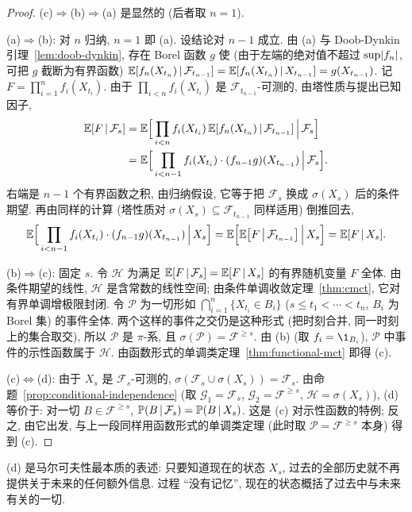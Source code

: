 \begin{proof}
(c)$\Rightarrow$(b)$\Rightarrow$(a) 是显然的 (后者取 $n=1$).

(a)$\Rightarrow$(b): 对 $n$ 归纳, $n=1$ 即 (a). 设结论对 $n-1$ 成立. 由 (a) 与 Doob-Dynkin 引理~\ref{lem:doob-dynkin}, 存在 Borel 函数 $g$ 使 (由于左端的绝对值不超过 $\sup\abs{f_n}$, 可把 $g$ 截断为有界函数) $\E[f_n(X_{t_n})\,|\,\mathcal{F}_{t_{n-1}}]=\E[f_n(X_{t_n})\,|\,X_{t_{n-1}}]=g(X_{t_{n-1}})$. 记 $F=\prod_{i=1}^nf_i(X_{t_i})$. 由于 $\prod_{i<n}f_i(X_{t_i})$ 是 $\mathcal{F}_{t_{n-1}}$-可测的, 由塔性质与提出已知因子,
\begin{align*}
\E[F\,|\,\mathcal{F}_s]&=\E\Big[\prod_{i<n}f_i(X_{t_i})\,\E[f_n(X_{t_n})\,|\,\mathcal{F}_{t_{n-1}}]\,\Big|\,\mathcal{F}_s\Big]\\
&=\E\Big[\prod_{i<n-1}f_i(X_{t_i})\cdot(f_{n-1}g)(X_{t_{n-1}})\,\Big|\,\mathcal{F}_s\Big].
\end{align*}
右端是 $n-1$ 个有界函数之积, 由归纳假设, 它等于把 $\mathcal{F}_s$ 换成 $\sigma(X_s)$ 后的条件期望. 再由同样的计算 (塔性质对 $\sigma(X_s)\subseteq\mathcal{F}_{t_{n-1}}$ 同样适用) 倒推回去,
\[
\E\Big[\prod_{i<n-1}f_i(X_{t_i})\cdot(f_{n-1}g)(X_{t_{n-1}})\,\Big|\,X_s\Big]=\E\Big[\E\big[F\,\big|\,\mathcal{F}_{t_{n-1}}\big]\,\Big|\,X_s\Big]=\E[F\,|\,X_s].
\]

(b)$\Rightarrow$(c): 固定 $s$. 令 $\mathcal{H}$ 为满足 $\E[F\,|\,\mathcal{F}_s]=\E[F\,|\,X_s]$ 的有界随机变量 $F$ 全体. 由条件期望的线性, $\mathcal{H}$ 是含常数的线性空间; 由条件单调收敛定理~\ref{thm:cmct}, 它对有界单调增极限封闭. 令 $\mathcal{P}$ 为一切形如 $\bigcap_{i=1}^n\{X_{t_i}\in B_i\}$ ($s\le t_1<\cdots<t_n$, $B_i$ 为 Borel 集) 的事件全体. 两个这样的事件之交仍是这种形式 (把时刻合并, 同一时刻上的集合取交), 所以 $\mathcal{P}$ 是 $\pi$-系, 且 $\sigma(\mathcal{P})=\mathcal{F}^{\ge s}$. 由 (b) (取 $f_i=\1_{B_i}$), $\mathcal{P}$ 中事件的示性函数属于 $\mathcal{H}$. 由函数形式的单调类定理~\ref{thm:functional-mct} 即得 (c).

(c)$\Leftrightarrow$(d): 由于 $X_s$ 是 $\mathcal{F}_s$-可测的, $\sigma(\mathcal{F}_s\cup\sigma(X_s))=\mathcal{F}_s$. 由命题~\ref{prop:conditional-independence} (取 $\mathcal{G}_1=\mathcal{F}_s$, $\mathcal{G}_2=\mathcal{F}^{\ge s}$, $\mathcal{H}=\sigma(X_s)$), (d) 等价于: 对一切 $B\in\mathcal{F}^{\ge s}$, $\P(B\,|\,\mathcal{F}_s)=\P(B\,|\,X_s)$. 这是 (c) 对示性函数的特例; 反之, 由它出发, 与上一段同样用函数形式的单调类定理 (此时取 $\mathcal{P}=\mathcal{F}^{\ge s}$ 本身) 得到 (c).
\end{proof}

\begin{intuition}
(d) 是马尔可夫性最本质的表述: 只要知道现在的状态 $X_s$, 过去的全部历史就不再提供关于未来的任何额外信息. 过程 ``没有记忆'', 现在的状态概括了过去中与未来有关的一切.
\end{intuition}

